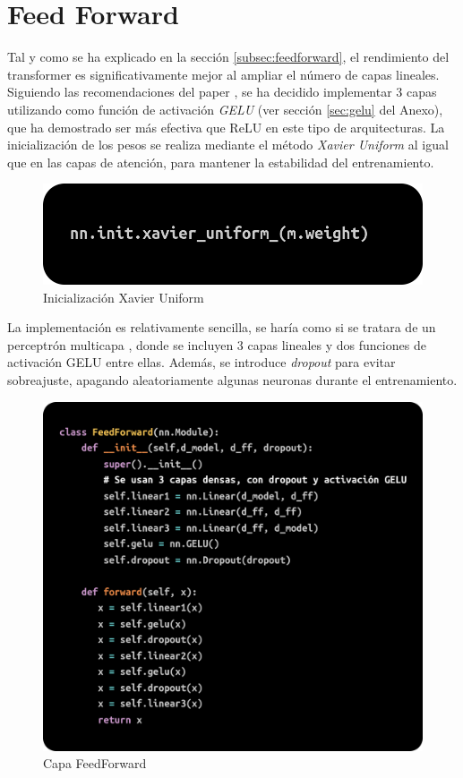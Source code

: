 \documentclass[11pt]{book}
\begin{document}
\section{Feed Forward} 
Tal y como se ha explicado en la sección \ref{subsec:feedforward}, el rendimiento del transformer es significativamente mejor al ampliar el número de capas lineales. Siguiendo las recomendaciones del paper \parencite{gerber2025ffn}, se ha decidido implementar 3 capas utilizando como función de activación \textit{GELU} (ver sección \ref{sec:gelu} del Anexo), que ha demostrado ser más efectiva que ReLU en este tipo de arquitecturas. La inicialización de los pesos se realiza mediante el método \textit{Xavier Uniform} al igual que en las capas de atención, para mantener la estabilidad del entrenamiento.

\begin{figure}[h]
    \centering
    \includegraphics[width=0.5\linewidth]{img/xavier_init.png}
    \caption{Inicialización Xavier Uniform}
    \label{fig:placeholder15}
\end{figure}

La implementación es relativamente sencilla, se haría como si se tratara de un perceptrón multicapa \parencite{kyeg_feedforward_demystified}, donde se incluyen 3 capas lineales y dos funciones de activación GELU entre ellas. Además, se introduce \textit{dropout} para evitar sobreajuste, apagando aleatoriamente algunas neuronas durante el entrenamiento.

\begin{figure}[h]
    \centering
    \includegraphics[width=0.5\linewidth]{img/ffnn.png}
    \caption{Capa FeedForward}
    \label{fig:placeholder16}
\end{figure}
\end{document}
